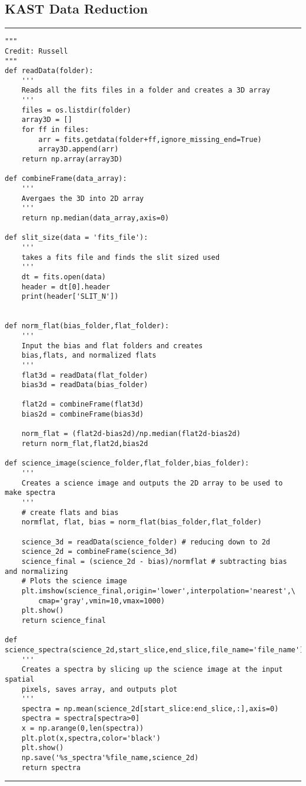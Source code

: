 \documentclass[preprint]{aastex62}
\begin{document}
\subsection{KAST Data Reduction} \label{code:stats}
\small
\hrule
\begin{lstlisting}
"""
Credit: Russell
"""
def readData(folder):
    '''
    Reads all the fits files in a folder and creates a 3D array
    '''
    files = os.listdir(folder)
    array3D = []
    for ff in files:
        arr = fits.getdata(folder+ff,ignore_missing_end=True)
        array3D.append(arr)
    return np.array(array3D)

def combineFrame(data_array):
    '''
    Avergaes the 3D into 2D array
    '''
    return np.median(data_array,axis=0)

def slit_size(data = 'fits_file'):
    '''
    takes a fits file and finds the slit sized used
    '''
    dt = fits.open(data)
    header = dt[0].header
    print(header['SLIT_N'])
    
    
def norm_flat(bias_folder,flat_folder):
    '''
    Input the bias and flat folders and creates
    bias,flats, and normalized flats
    '''
    flat3d = readData(flat_folder)
    bias3d = readData(bias_folder)

    flat2d = combineFrame(flat3d)
    bias2d = combineFrame(bias3d)

    norm_flat = (flat2d-bias2d)/np.median(flat2d-bias2d)
    return norm_flat,flat2d,bias2d

def science_image(science_folder,flat_folder,bias_folder):
    '''
    Creates a science image and outputs the 2D array to be used to make spectra
    '''
    # create flats and bias
    normflat, flat, bias = norm_flat(bias_folder,flat_folder) 

    science_3d = readData(science_folder) # reducing down to 2d 
    science_2d = combineFrame(science_3d)
    science_final = (science_2d - bias)/normflat # subtracting bias and normalizing
    # Plots the science image
    plt.imshow(science_final,origin='lower',interpolation='nearest',\
        cmap='gray',vmin=10,vmax=1000)
    plt.show()
    return science_final

def science_spectra(science_2d,start_slice,end_slice,file_name='file_name'):
    '''
    Creates a spectra by slicing up the science image at the input spatial
    pixels, saves array, and outputs plot
    '''
    spectra = np.mean(science_2d[start_slice:end_slice,:],axis=0)
    spectra = spectra[spectra>0]
    x = np.arange(0,len(spectra))
    plt.plot(x,spectra,color='black')
    plt.show()
    np.save('%s_spectra'%file_name,science_2d)
    return spectra
\end{lstlisting}
\hrule \vspace{7pt}
\end{document}
